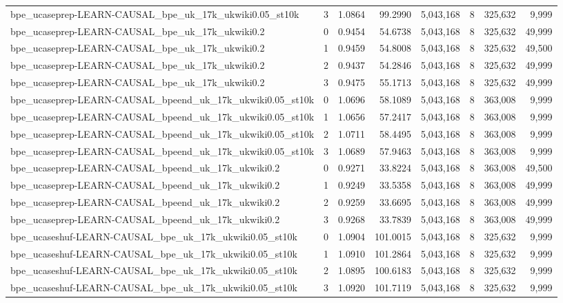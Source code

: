 \begin{tabular}{lrrrrrrr}
bpe\_ucaseprep-LEARN-CAUSAL\_bpe\_uk\_17k\_ukwiki0.05\_st10k & 3 & 1.0864 & 99.2990 & 5,043,168 & 8 & 325,632 & 9,999 \\
bpe\_ucaseprep-LEARN-CAUSAL\_bpe\_uk\_17k\_ukwiki0.2 & 0 & 0.9454 & 54.6738 & 5,043,168 & 8 & 325,632 & 49,999 \\
bpe\_ucaseprep-LEARN-CAUSAL\_bpe\_uk\_17k\_ukwiki0.2 & 1 & 0.9459 & 54.8008 & 5,043,168 & 8 & 325,632 & 49,500 \\
bpe\_ucaseprep-LEARN-CAUSAL\_bpe\_uk\_17k\_ukwiki0.2 & 2 & 0.9437 & 54.2846 & 5,043,168 & 8 & 325,632 & 49,999 \\
bpe\_ucaseprep-LEARN-CAUSAL\_bpe\_uk\_17k\_ukwiki0.2 & 3 & 0.9475 & 55.1713 & 5,043,168 & 8 & 325,632 & 49,999 \\
bpe\_ucaseprep-LEARN-CAUSAL\_bpeend\_uk\_17k\_ukwiki0.05\_st10k & 0 & 1.0696 & 58.1089 & 5,043,168 & 8 & 363,008 & 9,999 \\
bpe\_ucaseprep-LEARN-CAUSAL\_bpeend\_uk\_17k\_ukwiki0.05\_st10k & 1 & 1.0656 & 57.2417 & 5,043,168 & 8 & 363,008 & 9,999 \\
bpe\_ucaseprep-LEARN-CAUSAL\_bpeend\_uk\_17k\_ukwiki0.05\_st10k & 2 & 1.0711 & 58.4495 & 5,043,168 & 8 & 363,008 & 9,999 \\
bpe\_ucaseprep-LEARN-CAUSAL\_bpeend\_uk\_17k\_ukwiki0.05\_st10k & 3 & 1.0689 & 57.9463 & 5,043,168 & 8 & 363,008 & 9,999 \\
bpe\_ucaseprep-LEARN-CAUSAL\_bpeend\_uk\_17k\_ukwiki0.2 & 0 & 0.9271 & 33.8224 & 5,043,168 & 8 & 363,008 & 49,500 \\
bpe\_ucaseprep-LEARN-CAUSAL\_bpeend\_uk\_17k\_ukwiki0.2 & 1 & 0.9249 & 33.5358 & 5,043,168 & 8 & 363,008 & 49,999 \\
bpe\_ucaseprep-LEARN-CAUSAL\_bpeend\_uk\_17k\_ukwiki0.2 & 2 & 0.9259 & 33.6695 & 5,043,168 & 8 & 363,008 & 49,999 \\
bpe\_ucaseprep-LEARN-CAUSAL\_bpeend\_uk\_17k\_ukwiki0.2 & 3 & 0.9268 & 33.7839 & 5,043,168 & 8 & 363,008 & 49,999 \\
bpe\_ucaseshuf-LEARN-CAUSAL\_bpe\_uk\_17k\_ukwiki0.05\_st10k & 0 & 1.0904 & 101.0015 & 5,043,168 & 8 & 325,632 & 9,999 \\
bpe\_ucaseshuf-LEARN-CAUSAL\_bpe\_uk\_17k\_ukwiki0.05\_st10k & 1 & 1.0910 & 101.2864 & 5,043,168 & 8 & 325,632 & 9,999 \\
bpe\_ucaseshuf-LEARN-CAUSAL\_bpe\_uk\_17k\_ukwiki0.05\_st10k & 2 & 1.0895 & 100.6183 & 5,043,168 & 8 & 325,632 & 9,999 \\
bpe\_ucaseshuf-LEARN-CAUSAL\_bpe\_uk\_17k\_ukwiki0.05\_st10k & 3 & 1.0920 & 101.7119 & 5,043,168 & 8 & 325,632 & 9,999 \\

\end{tabular}
